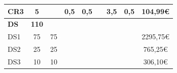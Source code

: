 \documentclass[a4paper]{article}
\begin{document}
\begin{table}[H]
\begin{center}
\begin{tabular}{|l|c|c|c|c|c|c|c|c|}
            {\color[HTML]{000000} CR3}                                                             & {\color[HTML]{000000} 5}                                                               & {\color[HTML]{000000} }                   & {\color[HTML]{000000} 0,5}                & {\color[HTML]{000000} 0,5}             & {\color[HTML]{000000} }                 & {\color[HTML]{000000} 3,5}                  & {\color[HTML]{000000} 0,5}                & {\color[HTML]{000000} 104,99€}             \\ \hline
            \rowcolor[HTML]{C0C0C0} 
            {\color[HTML]{000000} \textbf{DS}}                                                     & {\color[HTML]{000000} \textbf{110}}                                                     & {\color[HTML]{000000} \textbf{}}          & {\color[HTML]{000000} \textbf{}}        & {\color[HTML]{000000} \textbf{}}     & {\color[HTML]{000000} \textbf{}}        & {\color[HTML]{000000} \textbf{}}          & {\color[HTML]{000000} \textbf{}}        & {\color[HTML]{000000} \textbf{}}           \\ \hline
            {\color[HTML]{000000} DS1}                                                             & {\color[HTML]{000000} 75}                                                               & {\color[HTML]{000000} 75}                 & {\color[HTML]{000000} }                 & {\color[HTML]{000000} }              & {\color[HTML]{000000} }                 & {\color[HTML]{000000} }                   & {\color[HTML]{000000} }                 & {\color[HTML]{000000} 2295,75€}            \\ \hline
            {\color[HTML]{000000} DS2}                                                             & {\color[HTML]{000000} 25}                                                               & {\color[HTML]{000000} 25}                 & {\color[HTML]{000000} }                 & {\color[HTML]{000000} }              & {\color[HTML]{000000} }                 & {\color[HTML]{000000} }                   & {\color[HTML]{000000} }                 & {\color[HTML]{000000} 765,25€}             \\ \hline
            {\color[HTML]{000000} DS3}                                                             & {\color[HTML]{000000} 10}                                                               & {\color[HTML]{000000} 10}                 & {\color[HTML]{000000} }                 & {\color[HTML]{000000} }              & {\color[HTML]{000000} }                 & {\color[HTML]{000000} }                   & {\color[HTML]{000000} }                 & {\color[HTML]{000000} 306,10€}             \\ \hline

\end{tabular}
\end{center}
\end{table}
\end{document}
